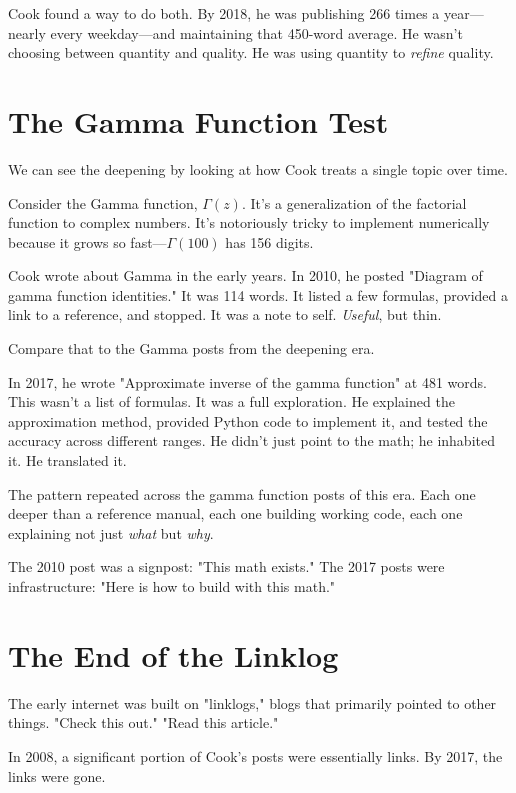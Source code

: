 Cook found a way to do both. By 2018, he was publishing 266 times a year---nearly every weekday---and maintaining that 450-word average. He wasn't choosing between quantity and quality. He was using quantity to \textit{refine} quality.

\bigskip

\section*{The Gamma Function Test}

We can see the deepening by looking at how Cook treats a single topic over time.

Consider the Gamma function, $\Gamma(z)$. It's a generalization of the factorial function to complex numbers. It's notoriously tricky to implement numerically because it grows so fast---$\Gamma(100)$ has 156 digits.

Cook wrote about Gamma in the early years. In 2010, he posted "Diagram of gamma function identities." It was 114 words. It listed a few formulas, provided a link to a reference, and stopped. It was a note to self. \textit{Useful}, but thin.

Compare that to the Gamma posts from the deepening era.

In 2017, he wrote "Approximate inverse of the gamma function" at 481 words. This wasn't a list of formulas. It was a full exploration. He explained the approximation method, provided Python code to implement it, and tested the accuracy across different ranges. He didn't just point to the math; he inhabited it. He translated it.

The pattern repeated across the gamma function posts of this era. Each one deeper than a reference manual, each one building working code, each one explaining not just \textit{what} but \textit{why}.

The 2010 post was a signpost: "This math exists."
The 2017 posts were infrastructure: "Here is how to build with this math."

\bigskip

\section*{The End of the Linklog}

The early internet was built on "linklogs," blogs that primarily pointed to other things. "Check this out." "Read this article."

In 2008, a significant portion of Cook's posts were essentially links.
By 2017, the links were gone.

